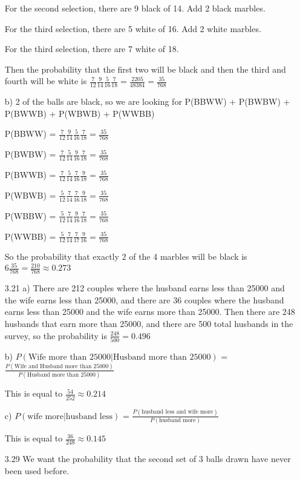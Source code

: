 \documentclass[11pt]{article}
\begin{document}
\begin{itemize}
	For the second selection, there are 9 black of 14. Add 2 black marbles.

	For the third selection, there are 5 white of 16. Add 2 white marbles.

	For the third selection, there are 7 white of 18.

	Then the probability that the first two will be black and then the third and fourth will be white is $\frac{7}{12} \frac{9}{14} \frac{5}{16} \frac{7}{18} = \frac{2205}{48384} = \frac{35}{768}$

	b) 
	2 of the balls are black, so we are looking for P(BBWW) + P(BWBW) + P(BWWB) + P(WBWB) + P(WWBB)

	P(BBWW) = $\frac{7}{12}\frac{9}{14}\frac{5}{16}\frac{7}{18} = \frac{35}{768}$

	P(BWBW) = $\frac{7}{12}\frac{5}{14}\frac{9}{16}\frac{7}{18} = \frac{35}{768}$

	P(BWWB) = $\frac{7}{12}\frac{5}{14}\frac{7}{16}\frac{9}{18} = \frac{35}{768}$

	P(WBWB) = $\frac{5}{12}\frac{7}{14}\frac{7}{16}\frac{9}{18} = \frac{35}{768}$

	P(WBBW) = $\frac{5}{12}\frac{7}{14}\frac{9}{16}\frac{7}{18} = \frac{35}{768}$

	P(WWBB) = $\frac{5}{12}\frac{7}{14}\frac{7}{17}\frac{9}{16} = \frac{35}{768}$

	So the probability that exactly 2 of the 4 marbles will be black is $6\frac{35}{768} = \frac{210}{768} \approx 0.273$
\item[3.21]
	a) There are 212 couples where the husband earns less than 25000 and the wife earns less than 25000, and there are 36 couples where the husband earns less than 25000 and the wife earns more than 25000. Then there are 248 husbands that earn more than 25000, and there are 500 total husbands in the survey, so the probability is $\frac{248}{500} = 0.496$

	b) $P(\text{Wife more than 25000} | \text{Husband more than 25000})$ = $\frac{P(\text{Wife and Husband more than 25000})}{P(\text{Husband more than 25000})}$

	This is equal to $\frac{54}{252} \approx 0.214$

	c) $P(\text{wife more} | \text{husband less})$ = $\frac{P(\text{husband less and wife more})}{P(\text{husband more})}$

	This is equal to $\frac{36}{248} \approx 0.145$
\item[3.29]
	We want the probability that the second set of 3 balls drawn have never been used before.


\end{itemize}
\end{document}
